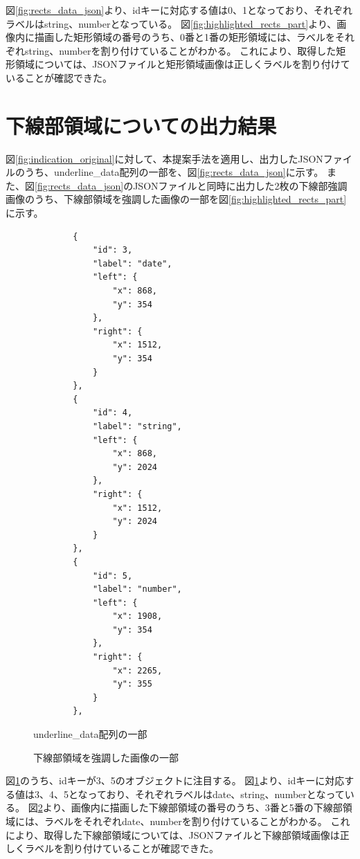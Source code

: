 図\ref{fig:rects_data_json}より、idキーに対応する値は0、1となっており、それぞれラベルはstring、numberとなっている。
図\ref{fig:highlighted_rects_part}より、画像内に描画した矩形領域の番号のうち、0番と1番の矩形領域には、ラベルをそれぞれstring、numberを割り付けていることがわかる。
これにより、取得した矩形領域については、JSONファイルと矩形領域画像は正しくラベルを割り付けていることが確認できた。


\section{下線部領域についての出力結果}\label{sec:result_underline}
図\ref{fig:indication_original}に対して、本提案手法を適用し、出力したJSONファイルのうち、underline\_data配列の一部を、図\ref{fig:rects_data_json}に示す。
また、図\ref{fig:rects_data_json}のJSONファイルと同時に出力した2枚の下線部強調画像のうち、下線部領域を強調した画像の一部を図\ref{fig:highlighted_rects_part}に示す。

\lstset{language=}
\begin{figure}[t]
    \begin{lstlisting}
        {
            "id": 3,
            "label": "date",
            "left": {
                "x": 868,
                "y": 354
            },
            "right": {
                "x": 1512,
                "y": 354
            }
        },
        {
            "id": 4,
            "label": "string",
            "left": {
                "x": 868,
                "y": 2024
            },
            "right": {
                "x": 1512,
                "y": 2024
            }
        },
        {
            "id": 5,
            "label": "number",
            "left": {
                "x": 1908,
                "y": 354
            },
            "right": {
                "x": 2265,
                "y": 355
            }
        },
    \end{lstlisting}
    \caption{underline\_data配列の一部}\label{fig:underlines_data_json}
\end{figure}

\begin{figure}[t]
    \begin{center}
        \caption{下線部領域を強調した画像の一部}
        \label{fig:highlighted_underlines_part}
    \end{center}
\end{figure}

図\ref{fig:underlines_data_json}のうち、idキーが3、5のオブジェクトに注目する。
図\ref{fig:underlines_data_json}より、idキーに対応する値は3、4、5となっており、それぞれラベルはdate、string、numberとなっている。
図\ref{fig:highlighted_underlines_part}より、画像内に描画した下線部領域の番号のうち、3番と5番の下線部領域には、ラベルをそれぞれdate、numberを割り付けていることがわかる。
これにより、取得した下線部領域については、JSONファイルと下線部領域画像は正しくラベルを割り付けていることが確認できた。